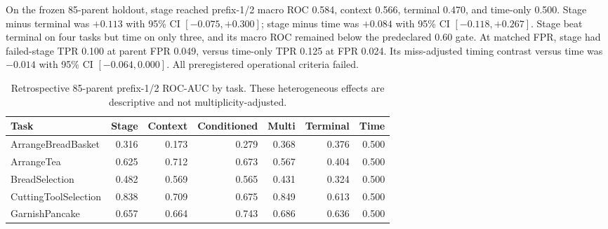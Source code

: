 On the frozen 85-parent holdout, stage reached prefix-1/2 macro ROC 0.584, context 0.566, terminal 0.470, and time-only 0.500. Stage minus terminal was $+0.113$ with 95\% CI $[-0.075,+0.300]$; stage minus time was $+0.084$ with 95\% CI $[-0.118,+0.267]$. Stage beat terminal on four tasks but time on only three, and its macro ROC remained below the predeclared 0.60 gate. At matched FPR, stage had failed-stage TPR 0.100 at parent FPR 0.049, versus time-only TPR 0.125 at FPR 0.024. Its miss-adjusted timing contrast versus time was $-0.014$ with 95\% CI $[-0.064,0.000]$. All preregistered operational criteria failed.

\begin{table}[H]
\centering
\caption{Retrospective 85-parent prefix-1/2 ROC-AUC by task. These heterogeneous effects are descriptive and not multiplicity-adjusted.}
\label{tab:phase1-context-by-task}
\small
\begin{tabular}{lrrrrrr}
\toprule
Task & Stage & Context & Conditioned & Multi & Terminal & Time \\
\midrule
ArrangeBreadBasket & 0.316 & 0.173 & 0.279 & 0.368 & 0.376 & 0.500 \\
ArrangeTea & 0.625 & 0.712 & 0.673 & 0.567 & 0.404 & 0.500 \\
BreadSelection & 0.482 & 0.569 & 0.565 & 0.431 & 0.324 & 0.500 \\
CuttingToolSelection & 0.838 & 0.709 & 0.675 & 0.849 & 0.613 & 0.500 \\
GarnishPancake & 0.657 & 0.664 & 0.743 & 0.686 & 0.636 & 0.500 \\
\bottomrule
\end{tabular}
\end{table}

